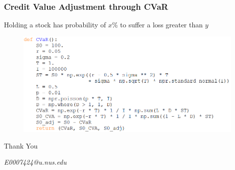 \documentclass{beamer}
\begin{document}
\begin{frame}
\frametitle{Credit Value Adjustment through CVaR}
\begin{center}
Holding a stock has probability of $x$\% to suffer a loss greater than $y$
\end{center}
\begin{figure}[H]
	\includegraphics[scale=0.45]{CVaR.png}
\end{figure}
\end{frame}

\begin{frame}
\Huge{\centerline{Thank You}}
\begin{center}
\begin{normalsize}
\emph{E0007424@u.nus.edu}
\end{normalsize}
\end{center}
\end{frame}


\end{document}
